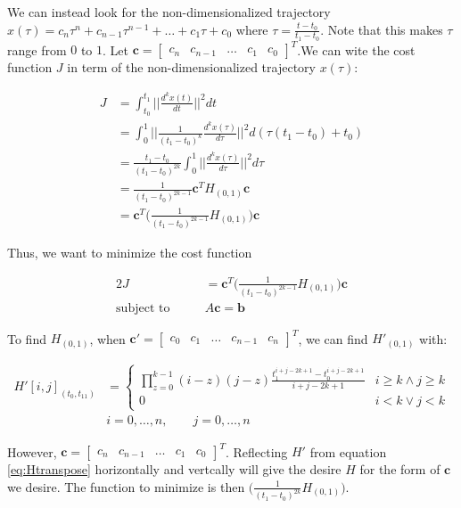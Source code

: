 \noindent We can instead look for the non-dimensionalized trajectory $x(\tau)=c_n\tau^n+c_{n-1}\tau^{n-1}+\dots+c_1\tau+c_0$ where $\tau=\frac{t-t_0}{t_1-t_0}$. Note that this makes $\tau$ range from $0$ to $1$. Let $\mathbf{c}=\begin{bmatrix}c_n & c_{n-1} & \dots & c_1 & c_0\end{bmatrix}^T$.We can wite the cost function $J$ in term of the non-dimensionalized trajectory $x(\tau)$:

\begin{align}
	J &= \int_{t_0}^{t_1}\Bigg|\Bigg|\frac{d^kx(t)}{dt}\Bigg|\Bigg|^2dt \\
	&= \int_0^1\Bigg|\Bigg|\frac{1}{(t_1-t_0)^k}\frac{d^kx(\tau)}{d\tau}\Bigg|\Bigg|^2d(\tau(t_1-t_0)+t_0) \nonumber \\
	&= \frac{t_1-t_0}{(t_1-t_0)^{2k}}\int_0^1\Bigg|\Bigg|\frac{d^kx(\tau)}{d\tau}\Bigg|\Bigg|^2d\tau \nonumber \\
	&= \frac{1}{(t_1-t_0)^{2k-1}}\mathbf{c}^TH_{(0,1)}\mathbf{c} \nonumber \\
	&= \mathbf{c}^T\Bigg(\frac{1}{(t_1-t_0)^{2k-1}}H_{(0,1)}\Bigg)\mathbf{c} \nonumber
\end{align}

\noindent Thus, we want to minimize the cost function

\begin{alignat}{2}
	J &= \mathbf{c}^T\Bigg(\frac{1}{(t_1-t_0)^{2k-1}}H_{(0,1)}\Bigg)\mathbf{c} \\
	\text{subject to}\qquad & A\mathbf{c} = \mathbf{b} \nonumber
\end{alignat}

\noindent To find $H_{(0,1)}$, when $\mathbf{c}'=\begin{bmatrix}c_0 & c_1 & \dots & c_{n-1} & c_n\end{bmatrix}^T$, we can find $H'_{(0,1)}$ with:

\begin{align}
	H'[i,j]_{(t_0,t_11)} &=
	\begin{cases}
		\prod\limits_{z=0}^{k-1}(i-z)(j-z)\frac{t_1^{i+j-2k+1}-t_0^{i+j-2k+1}}{i+j-2k+1} & i\ge k \wedge j\ge k \\
		0 & i<k \vee j<k
	\end{cases} \label{eq:Htranspose} \\
	& i=0,\dots,n,\qquad j=0,\dots,n \nonumber
\end{align}

\noindent However, $\mathbf{c}=\begin{bmatrix}c_n & c_{n-1} & \dots & c_1 & c_0\end{bmatrix}^T$. Reflecting $H'$ from equation \eqref{eq:Htranspose} horizontally and vertcally will give the desire $H$ for the form of $\mathbf{c}$ we desire. The function to minimize is then $\Bigg(\frac{1}{(t_1-t_0)^{2k}}H_{(0,1)}\Bigg)$.

